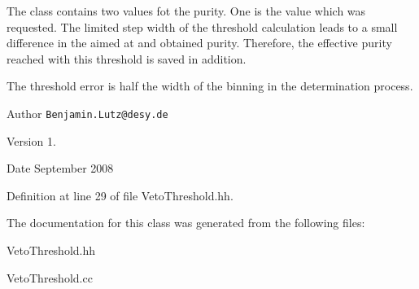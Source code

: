 The class contains two values fot the purity. One is the value which was requested. The limited step width of the threshold calculation leads to a small difference in the aimed at and obtained purity. Therefore, the effective purity reached with this threshold is saved in addition.

The threshold error is half the width of the binning in the determination process.

\begin{DoxyAuthor}{Author}
{\tt Benjamin.\-Lutz@desy.\-de} 
\end{DoxyAuthor}
\begin{DoxyVersion}{Version}
1. 
\end{DoxyVersion}
\begin{DoxyDate}{Date}
September 2008 
\end{DoxyDate}


Definition at line 29 of file Veto\-Threshold.\-hh.



The documentation for this class was generated from the following files\-:\begin{DoxyCompactItemize}
\item 
Veto\-Threshold.\-hh\item 
Veto\-Threshold.\-cc\end{DoxyCompactItemize}

